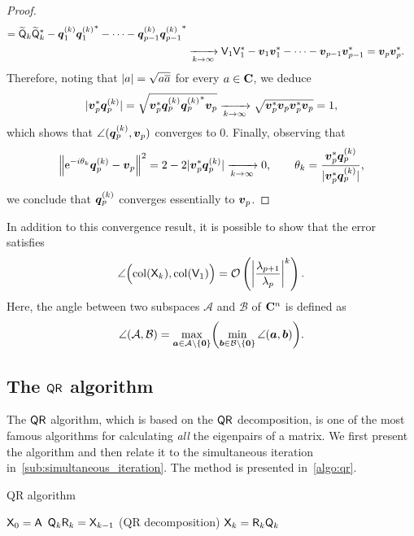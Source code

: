 \begin{proof}
\begin{align*}
        = \widetilde{\mat Q}_k \widetilde{\mat Q}_k^* - \vect q_1^{(k)} {\vect q_1^{(k)}}^* - \dotsb - \vect q_{p-1}^{(k)} {\vect q_{p-1}^{(k)}}^* \\
        &\xrightarrow[k \to \infty]{} \mat V_1 \mat V_1^* - \vect v_1 \vect v_1^* - \dotsb - \vect v_{p-1} \vect v_{p-1}^* = \vect v_p \vect v_p^{*}.
    \end{align*}
    Therefore, noting that $\abs{a} = \sqrt{a \overline a}$ for every $a \in \complex$,
    we deduce
    \[
        \abs{\vect v_p^* \vect q_p^{(k)}} = \sqrt{\vect v_p^* \vect q_p^{(k)} {\vect q_p^{(k)}}^* \vect v_p} \xrightarrow[k \to \infty]{} \sqrt{\vect v_p^* \vect v_p \vect v_p^* \vect v_p} = 1,
    \]
    which shows that $\angle(\vect q_p^{(k)}, \vect v_p)$ converges to 0.
    Finally, observing that
    \[
        \norm*{\e^{- i \theta_k}\vect q_p^{(k)} - \vect v_p}^2 = 2 - 2 \abs{\vect v_p^* \vect q_p^{(k)}} \xrightarrow[k \to \infty]{} 0, \qquad
        \theta_k = \frac{\vect v_p^* \vect q_p^{(k)}}{\abs{\vect v_p^* \vect q_p^{(k)}}},
    \]
    we conclude that $\vect q_p^{(k)}$ converges essentially to $\vect v_p$.
\end{proof}

In addition to this convergence result,
it is possible to show that the error satisfies
\[
    \angle \Bigl(\col(\mat X_k), \col(\mat V_1)\Bigr)
    = \mathcal O \left( \abs*{\frac{\lambda_{p+1}}{\lambda_p}}^k \right).
\]
Here,
the angle between two subspaces $\mathcal A$ and $\mathcal B$ of $\complex^n$ is defined as
\[
    \angle (\mathcal A, \mathcal B) = \max_{\vect a \in \mathcal A \backslash \{\vect 0\}} \biggl( \min_{\vect b \in \mathcal B \backslash \{\vect 0\}} \angle(\vect a, \vect b) \biggr).
\]

\subsection{The $\mat Q \mat R$ algorithm}
The $\mat Q \mat R$ algorithm,
which is based on the $\mat Q \mat R$ decomposition,
is one of the most famous algorithms for calculating \emph{all} the eigenpairs of a matrix.
We first present the algorithm and then relate it to the simultaneous iteration in~\cref{sub:simultaneous_iteration}.
The method is presented in~\cref{algo:qr}.
\begin{algorithm}
\caption{QR algorithm}%
\label{algo:qr}%
\begin{algorithmic}
\State $\mat X_0 = \mat A$
    \State $\mat Q_k \mat R_k = \mat X_{k-1}$ (QR decomposition)
    \State $\mat X_{k} = \mat R_k \mat Q_k$
\EndFor
\end{algorithmic}
\end{algorithm}

